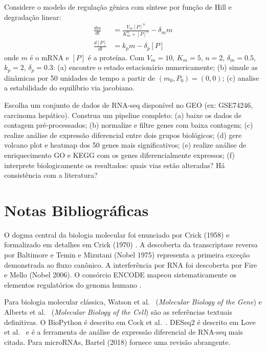 \begin{exercicio}
Considere o modelo de regulação gênica com síntese por função de Hill e degradação linear:
\begin{align*}
  \frac{dm}{dt} &= \frac{V_m [P]^n}{K_m^n + [P]^n} - \delta_m m \\
  \frac{d[P]}{dt} &= k_p m - \delta_p [P]
\end{align*}
onde $m$ é o mRNA e $[P]$ é a proteína. Com $V_m = 10$, $K_m = 5$, $n = 2$,
$\delta_m = 0.5$, $k_p = 2$, $\delta_p = 0.3$: (a) encontre o estado estacionário
numericamente; (b) simule as dinâmicas por 50 unidades de tempo a partir de $(m_0, P_0) = (0, 0)$;
(c) analise a estabilidade do equilíbrio via jacobiano.
\end{exercicio}

\begin{exercicio}
Escolha um conjunto de dados de RNA-seq disponível no GEO (ex: GSE74246, carcinoma
hepático). Construa um pipeline completo: (a) baixe os dados de contagem pré-processados;
(b) normalize e filtre genes com baixa contagem; (c) realize análise de expressão
diferencial entre dois grupos biológicos; (d) gere volcano plot e heatmap dos 50 genes
mais significativos; (e) realize análise de enriquecimento GO e KEGG com os genes
diferencialmente expressos; (f) interprete biologicamente os resultados: quais vias estão
alteradas? Há consistência com a literatura?
\end{exercicio}

\section{Notas Bibliográficas}

O dogma central da biologia molecular foi enunciado por Crick (1958) \cite{crick1958} e
formalizado em detalhes em Crick (1970) \cite{crick1970}. A descoberta da transcriptase
reversa por Baltimore \cite{baltimore1970} e Temin e Mizutani \cite{temin1970} (Nobel 1975)
representa a primeira exceção demonstrada ao fluxo canônico. A interferência por RNA foi
descoberta por Fire e Mello \cite{fire1998} (Nobel 2006). O consórcio ENCODE mapeou
sistematicamente os elementos regulatórios do genoma humano \cite{encode2012}.

Para biologia molecular clássica, Watson et al.\ \cite{watson2013} (\textit{Molecular
Biology of the Gene}) e Alberts et al.\ \cite{alberts2022} (\textit{Molecular Biology of
the Cell}) são as referências textuais definitivas. O BioPython é descrito em Cock et al.\
\cite{cock2009}. DESeq2 é descrito em Love et al.\ \cite{love2014} e é a ferramenta de
análise de expressão diferencial de RNA-seq mais citada. Para microRNAs, Bartel (2018)
\cite{bartel2018} fornece uma revisão abrangente.

